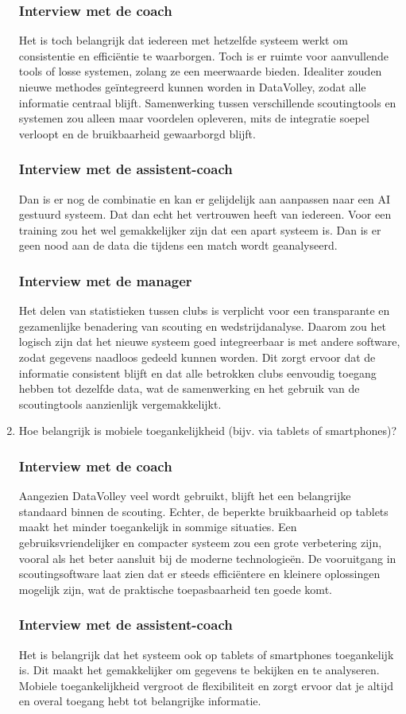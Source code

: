\begin{enumerate}
  \subsubsection{Interview met de coach}
  Het is toch belangrijk dat iedereen met hetzelfde systeem werkt om consistentie en efficiëntie te waarborgen. Toch is er ruimte voor aanvullende tools of losse systemen, zolang ze een meerwaarde bieden. Idealiter zouden nieuwe methodes geïntegreerd kunnen worden in DataVolley, zodat alle informatie centraal blijft. Samenwerking tussen verschillende scoutingtools en systemen zou alleen maar voordelen opleveren, mits de integratie soepel verloopt en de bruikbaarheid gewaarborgd blijft.
  \subsubsection{Interview met de assistent-coach}
  Dan is er nog de combinatie en kan er gelijdelijk aan aanpassen naar een AI gestuurd systeem. Dat dan echt het vertrouwen heeft van iedereen. Voor een training zou het wel gemakkelijker zijn dat een apart systeem is. Dan is er geen nood aan de data die tijdens een match wordt geanalyseerd.
  \subsubsection{Interview met de manager}
  Het delen van statistieken tussen clubs is verplicht voor een transparante en gezamenlijke benadering van scouting en wedstrijdanalyse. Daarom zou het logisch zijn dat het nieuwe systeem goed integreerbaar is met andere software, zodat gegevens naadloos gedeeld kunnen worden. Dit zorgt ervoor dat de informatie consistent blijft en dat alle betrokken clubs eenvoudig toegang hebben tot dezelfde data, wat de samenwerking en het gebruik van de scoutingtools aanzienlijk vergemakkelijkt.
  \item Hoe belangrijk is mobiele toegankelijkheid (bijv. via tablets of smartphones)?
  \subsubsection{Interview met de coach}
  Aangezien DataVolley veel wordt gebruikt, blijft het een belangrijke standaard binnen de scouting. Echter, de beperkte bruikbaarheid op tablets maakt het minder toegankelijk in sommige situaties. Een gebruiksvriendelijker en compacter systeem zou een grote verbetering zijn, vooral als het beter aansluit bij de moderne technologieën. De vooruitgang in scoutingsoftware laat zien dat er steeds efficiëntere en kleinere oplossingen mogelijk zijn, wat de praktische toepasbaarheid ten goede komt.
  \subsubsection{Interview met de assistent-coach}
  Het is belangrijk dat het systeem ook op tablets of smartphones toegankelijk is. Dit maakt het gemakkelijker om gegevens te bekijken en te analyseren. Mobiele toegankelijkheid vergroot de flexibiliteit en zorgt ervoor dat je altijd en overal toegang hebt tot belangrijke informatie.
\end{enumerate}

